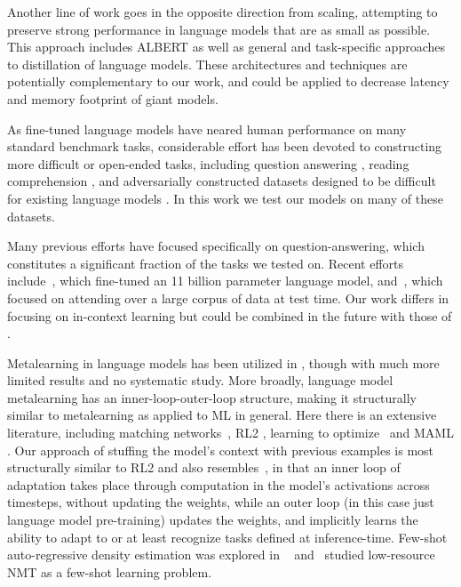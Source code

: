 \documentclass{article}
\begin{document}
Another line of work goes in the opposite direction from scaling, attempting to preserve strong performance in language models that are as small as possible.  This approach includes ALBERT \cite{lan2019albert} as well as general \cite{hinton2015distilling} and task-specific \cite{sanh2019distilbert,jiao2019tinybert,yoon2016sequencedistil} approaches to distillation of language models.  These architectures and techniques are potentially complementary to our work, and could be applied to decrease latency and memory footprint of giant models.

As fine-tuned language models have neared human performance on many standard benchmark tasks, considerable effort has been devoted to constructing more difficult or open-ended tasks, including question answering \cite{Kwiatkowski2019nq,Iyyer2014quiz, Clark2018ThinkYH,Mihaylov2018CanAS}, reading comprehension \cite{choi2018quac,reddy2019coqa}, and adversarially constructed datasets designed to be difficult for existing language models \cite{sakaguchi2019winogrande,nie2019adversarial}.  In this work we test our models on many of these datasets.

Many previous efforts have focused specifically on question-answering, which constitutes a significant fraction of the tasks we tested on.  Recent efforts include~\citep{raffel2019t5, roberts2020much}, which fine-tuned an 11 billion parameter language model, and~\cite{guu2020realm}, which focused on attending over a large corpus of data at test time.  Our work differs in focusing on in-context learning but could be combined in the future with those of \cite{guu2020realm,lewis2020retrieval}.


Metalearning in language models has been utilized in \cite{radford2019language}, though with much more limited results and no systematic study.  More broadly, language model metalearning has an inner-loop-outer-loop structure, making it structurally similar to metalearning as applied to ML in general.  Here there is an extensive literature, including matching networks~\citep{vinyals2016matching}, RL2 \cite{Duan2016RL2FR},  learning to optimize~\citep{ravi2016optimization, andrychowicz2016learning, li2017learning} and MAML \cite{Finn2017ModelAgnosticMF}.  Our approach of stuffing the model’s context with previous examples is most structurally similar to RL2 and also resembles~\cite{hochreiter2001learning}, in that an inner loop of adaptation takes place through computation in the model’s activations across timesteps, without updating the weights, while an outer loop (in this case just language model pre-training) updates the weights, and implicitly learns the ability to adapt to or at least recognize tasks defined at inference-time. Few-shot auto-regressive density estimation was explored in ~\cite{reed2017few} and~\cite{gu2018meta} studied low-resource NMT as a few-shot learning problem.
\end{document}
